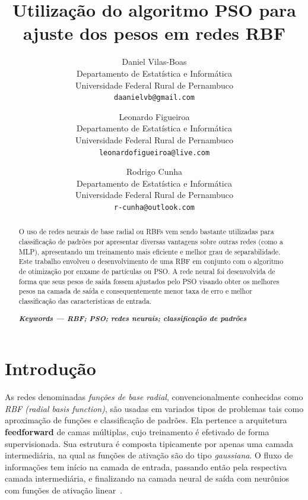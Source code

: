 \documentclass[10pt,twocolumn,letterpaper]{article}
\begin{document}
\title{\Huge Utilização do algoritmo PSO para ajuste dos pesos em redes RBF}

\author{Daniel Vilas-Boas\\
\footnotesize Departamento de Estatística e Informática\\
\footnotesize Universidade Federal Rural de Pernambuco\\
{\tt\small daanielvb@gmail.com}
\and
Leonardo Figueiroa\\
\footnotesize Departamento de Estatística e Informática\\
\footnotesize Universidade Federal Rural de Pernambuco\\
{\tt\small leonardofigueiroa@live.com}
\and
Rodrigo Cunha\\
\footnotesize Departamento de Estatística e Informática\\
\footnotesize Universidade Federal Rural de Pernambuco\\
{\tt\small r-cunha@outlook.com}
}

\maketitle

\begin{abstract}
O uso de redes neurais de base radial ou RBFs vem sendo bastante utilizadas para classificação de padrões por apresentar diversas vantagens sobre outras redes (como a MLP), apresentando um treinamento mais eficiente e melhor grau de separabilidade. Este trabalho envolveu o desenvolvimento de uma RBF em conjunto com o algoritmo de otimização por enxame de partículas ou PSO. A rede neural foi desenvolvida de forma que seus pesos de saída fossem ajustados pelo PSO visando obter os melhores pesos na camada de saída e consequentemente menor taxa de erro e melhor classificação das características de entrada.\\
\begin{center}
\textbf{\textit{Keywords --- RBF; PSO; redes neurais; classificação de padrões}}\\
\end{center}
\end{abstract}


\section{Introdução}
As redes denominadas \textit{funções de base radial}, convencionalmente conhecidas como \textit{RBF (radial basis function)}, são usadas em variados tipos de problemas tais como aproximação de funções e classificação de padrões. Ela pertence a arquitetura \textbf{feedforward} de camas múltiplas, cujo treinamento é efetivado de forma supervisionada. Sua estrutura é composta tipicamente por apenas uma camada intermediária, na qual as funções de ativação são do tipo \textit{gaussiana}. O fluxo de informações tem início na camada de entrada, passando então pela respectiva camada intermediária, e finalizando na camada neural de saída com neurônios com funções de ativação linear~\cite{livroAula}.\\ 
\end{document}
